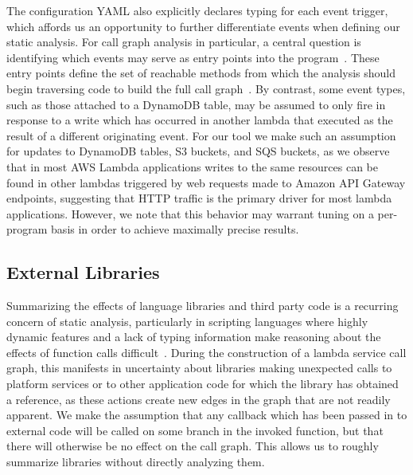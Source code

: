 \documentclass[letterpaper,twocolumn,10pt]{article}
\begin{document}
The configuration YAML also explicitly declares typing for each event trigger, which affords us an opportunity to further differentiate events when defining our static analysis. For call graph analysis in particular, a central question is identifying which events may serve as entry points into the program~\cite{androidcallgraph}. These entry points define the set of reachable methods from which the analysis should begin traversing code to build the full call graph~\cite{introcallgraph}. By contrast, some event types, such as those attached to a DynamoDB table, may be assumed to only fire in response to a write which has occurred in another lambda that executed as the result of a different originating event. For our tool we make such an assumption for updates to DynamoDB tables, S3 buckets, and SQS buckets, as we observe that in most AWS Lambda applications writes to the same resources can be found in other lambdas triggered by web requests made to Amazon API Gateway endpoints, suggesting that HTTP traffic is the primary driver for most lambda applications. However, we note that this behavior may warrant tuning on a per-program basis in order to achieve maximally precise results.


\subsection{External Libraries}
Summarizing the effects of language libraries and third party code is a recurring concern of static analysis, particularly in scripting languages where highly dynamic features and a lack of typing information make reasoning about the effects of function calls difficult~\cite{bigjs}. During the construction of a lambda service call graph, this manifests in uncertainty about libraries making unexpected calls to platform services or to other application code for which the library has obtained a reference, as these actions create new edges in the graph that are not readily apparent. We make the assumption that any callback which has been passed in to external code will be called on some branch in the invoked function, but that there will otherwise be no effect on the call graph. This allows us to roughly summarize libraries without directly analyzing them.
\end{document}
